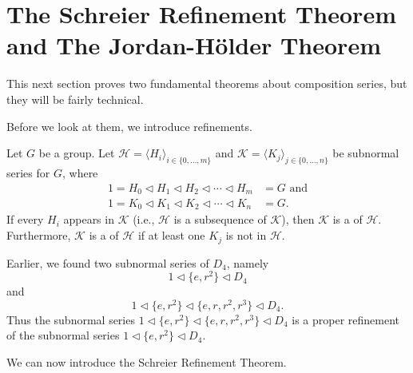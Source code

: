 \section{The Schreier Refinement Theorem and The Jordan-H\"older Theorem}
This next section proves two fundamental theorems about composition series, but they will be fairly technical.

Before we look at them, we introduce refinements.
\begin{definition}
    Let $G$ be a group. Let $\mathcal{H} = \langle H_i \rangle_{i\in\{0,\dots,m\}}$ and $\mathcal{K} = \langle K_j \rangle_{j\in\{0,\dots,n\}}$ be subnormal series for $G$, where
    \begin{align*}
        1 = H_0 \lhd H_1 \lhd H_2 \lhd \cdots \lhd H_m &= G \text{ and}\\
        1 = K_0 \lhd K_1 \lhd K_2 \lhd \cdots \lhd K_n &= G.
    \end{align*}
    If every $H_i$ appears in $\mathcal{K}$ (i.e., $\mathcal{H}$ is a subsequence of $\mathcal{K}$), then $\mathcal{K}$ is a  of $\mathcal{H}$. Furthermore, $\mathcal{K}$ is a  of $\mathcal{H}$ if at least one $K_j$ is not in $\mathcal{H}$.
\end{definition}
\begin{example}
    Earlier, we found two subnormal series of $D_4$, namely
    \[
        1 \lhd \{e, r^2\} \lhd D_4
    \]
    and
    \[
        1 \lhd \{e, r^2\} \lhd \{e, r, r^2, r^3\} \lhd D_4.
    \]
    Thus the subnormal series $1 \lhd \{e, r^2\} \lhd \{e, r, r^2, r^3\} \lhd D_4$ is a proper refinement of the subnormal series $1 \lhd \{e, r^2\} \lhd D_4$.
\end{example}

We can now introduce the Schreier Refinement Theorem.

